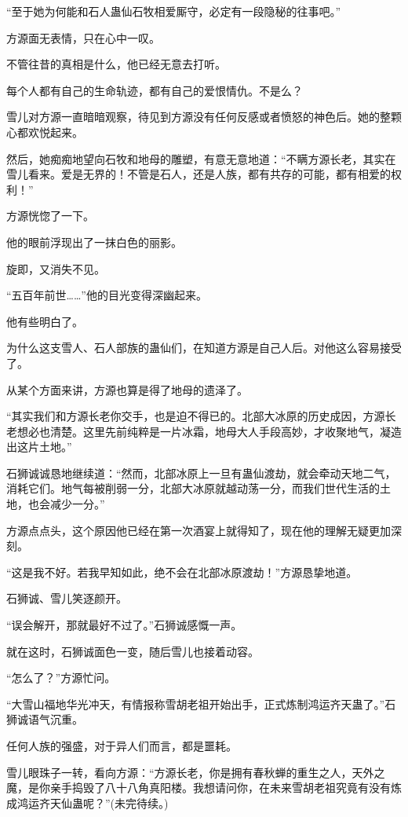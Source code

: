 \begin{this_body}
“至于她为何能和石人蛊仙石牧相爱厮守，必定有一段隐秘的往事吧。”

方源面无表情，只在心中一叹。

不管往昔的真相是什么，他已经无意去打听。

每个人都有自己的生命轨迹，都有自己的爱恨情仇。不是么？

雪儿对方源一直暗暗观察，待见到方源没有任何反感或者愤怒的神色后。她的整颗心都欢悦起来。

然后，她痴痴地望向石牧和地母的雕塑，有意无意地道：“不瞒方源长老，其实在雪儿看来。爱是无界的！不管是石人，还是人族，都有共存的可能，都有相爱的权利！”

方源恍惚了一下。

他的眼前浮现出了一抹白色的丽影。

旋即，又消失不见。

“五百年前世……”他的目光变得深幽起来。

他有些明白了。

为什么这支雪人、石人部族的蛊仙们，在知道方源是自己人后。对他这么容易接受了。

从某个方面来讲，方源也算是得了地母的遗泽了。

“其实我们和方源长老你交手，也是迫不得已的。北部大冰原的历史成因，方源长老想必也清楚。这里先前纯粹是一片冰霜，地母大人手段高妙，才收聚地气，凝造出这片土地。”

石狮诚诚恳地继续道：“然而，北部冰原上一旦有蛊仙渡劫，就会牵动天地二气，消耗它们。地气每被削弱一分，北部大冰原就越动荡一分，而我们世代生活的土地，也会减少一分。”

方源点点头，这个原因他已经在第一次酒宴上就得知了，现在他的理解无疑更加深刻。

“这是我不好。若我早知如此，绝不会在北部冰原渡劫！”方源恳挚地道。

石狮诚、雪儿笑逐颜开。

“误会解开，那就最好不过了。”石狮诚感慨一声。

就在这时，石狮诚面色一变，随后雪儿也接着动容。

“怎么了？”方源忙问。

“大雪山福地华光冲天，有情报称雪胡老祖开始出手，正式炼制鸿运齐天蛊了。”石狮诚语气沉重。

任何人族的强盛，对于异人们而言，都是噩耗。

雪儿眼珠子一转，看向方源：“方源长老，你是拥有春秋蝉的重生之人，天外之魔，是你亲手捣毁了八十八角真阳楼。我想请问你，在未来雪胡老祖究竟有没有炼成鸿运齐天仙蛊呢？”(未完待续。)

\end{this_body}

